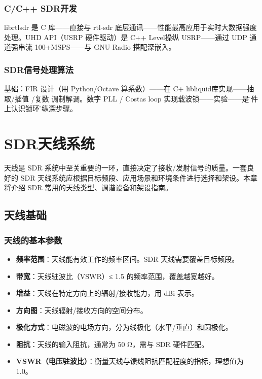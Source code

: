 \documentclass[12pt,UTF8]{ctexbook}
\begin{document}
\subsection{C/C++ SDR开发}

librtlsdr 是 C 库——直接与 rtl-sdr 底层通讯——性能最高应用于实时大数据强度处理。UHD API（USRP 硬件驱动）是 C++ Level操纵 USRP——通过 UDP 通道强串流 100+MSPS——与 GNU Radio 搭配深嵌入。

\subsection{SDR信号处理算法}

基础：FIR 设计（用 Python/Octave 算系数）——在 C+ libliquid库实现——抽取/插值 /复数 调制解调。数字 PLL / Costas loop 实现载波锁——实验——是\"软件上认识锁环\"的纵深步骤。

\chapter{SDR天线系统}
\label{chap:sdr_antennas}

天线是 SDR 系统中至关重要的一环，直接决定了接收/发射信号的质量。一套良好的 SDR 天线系统应根据目标频段、应用场景和环境条件进行选择和架设。本章将介绍 SDR 常用的天线类型、调谐设备和架设指南。

\section{天线基础}
\label{sec:antenna_basics}

\subsection{天线的基本参数}
\begin{itemize}[leftmargin=2cm]
    \item \textbf{频率范围}：天线能有效工作的频率区间。SDR 天线需要覆盖目标频段。
    \item \textbf{带宽}：天线驻波比（VSWR）≤ 1.5 的频率范围，覆盖越宽越好。
    \item \textbf{增益}：天线在特定方向上的辐射/接收能力，用 dBi 表示。
    \item \textbf{方向图}：天线辐射/接收方向的空间分布。
    \item \textbf{极化方式}：电磁波的电场方向，分为线极化（水平/垂直）和圆极化。
    \item \textbf{阻抗}：天线的输入阻抗，通常为 50 Ω，需与 SDR 硬件匹配。
    \item \textbf{VSWR（电压驻波比）}：衡量天线与馈线阻抗匹配程度的指标，理想值为 1.0。
\end{itemize}
\end{document}
